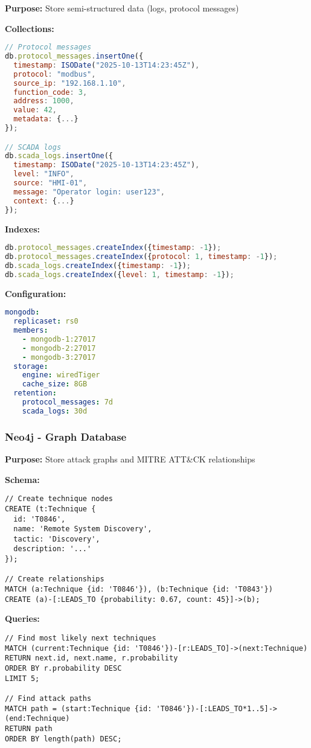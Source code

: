 \documentclass[12pt,a4paper]{article}
\begin{document}
\textbf{Purpose:} Store semi-structured data (logs, protocol messages)

\textbf{Collections:}
\begin{lstlisting}[language=javascript]
// Protocol messages
db.protocol_messages.insertOne({
  timestamp: ISODate("2025-10-13T14:23:45Z"),
  protocol: "modbus",
  source_ip: "192.168.1.10",
  function_code: 3,
  address: 1000,
  value: 42,
  metadata: {...}
});

// SCADA logs
db.scada_logs.insertOne({
  timestamp: ISODate("2025-10-13T14:23:45Z"),
  level: "INFO",
  source: "HMI-01",
  message: "Operator login: user123",
  context: {...}
});
\end{lstlisting}

\textbf{Indexes:}
\begin{lstlisting}[language=javascript]
db.protocol_messages.createIndex({timestamp: -1});
db.protocol_messages.createIndex({protocol: 1, timestamp: -1});
db.scada_logs.createIndex({timestamp: -1});
db.scada_logs.createIndex({level: 1, timestamp: -1});
\end{lstlisting}

\textbf{Configuration:}
\begin{lstlisting}[language=yaml]
mongodb:
  replicaset: rs0
  members:
    - mongodb-1:27017
    - mongodb-2:27017
    - mongodb-3:27017
  storage:
    engine: wiredTiger
    cache_size: 8GB
  retention:
    protocol_messages: 7d
    scada_logs: 30d
\end{lstlisting}

\subsubsection{Neo4j - Graph Database}

\textbf{Purpose:} Store attack graphs and MITRE ATT\&CK relationships

\textbf{Schema:}
\begin{lstlisting}[language=cypher]
// Create technique nodes
CREATE (t:Technique {
  id: 'T0846',
  name: 'Remote System Discovery',
  tactic: 'Discovery',
  description: '...'
});

// Create relationships
MATCH (a:Technique {id: 'T0846'}), (b:Technique {id: 'T0843'})
CREATE (a)-[:LEADS_TO {probability: 0.67, count: 45}]->(b);
\end{lstlisting}

\textbf{Queries:}
\begin{lstlisting}[language=cypher]
// Find most likely next techniques
MATCH (current:Technique {id: 'T0846'})-[r:LEADS_TO]->(next:Technique)
RETURN next.id, next.name, r.probability
ORDER BY r.probability DESC
LIMIT 5;

// Find attack paths
MATCH path = (start:Technique {id: 'T0846'})-[:LEADS_TO*1..5]->(end:Technique)
RETURN path
ORDER BY length(path) DESC;
\end{lstlisting}
\end{document}
